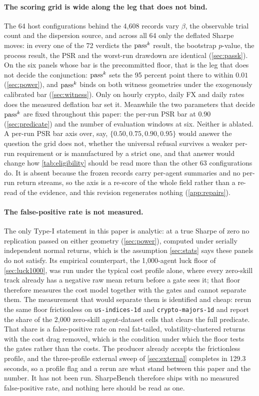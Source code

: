 \paragraph{The scoring grid is wide along the leg that does not bind.} The 64 host configurations behind the 4{,}608 records vary $\beta$, the observable trial count and the dispersion source, and across all 64 only the deflated Sharpe moves: in every one of the 72 verdicts the $\text{pass}^{k}$ result, the bootstrap $p$-value, the process result, the PSR and the worst-run drawdown are identical (\cref{sec:passk}). On the six panels whose bar is the precommitted floor, that is the leg that does not decide the conjunction: $\text{pass}^{k}$ sets the 95 percent point there to within $0.01$ (\cref{sec:power}), and $\text{pass}^{k}$ binds on both witness geometries under the exogenously calibrated bar (\cref{sec:witness}). Only on hourly crypto, daily FX and daily rates does the measured deflation bar set it. Meanwhile the two parameters that decide $\text{pass}^{k}$ are fixed throughout this paper: the per-run PSR bar at $0.90$ (\cref{sec:predicate}) and the number of evaluation windows at six. Neither is ablated. A per-run PSR bar axis over, say, $\{0.50, 0.75, 0.90, 0.95\}$ would answer the question the grid does not, whether the universal refusal survives a weaker per-run requirement or is manufactured by a strict one, and that answer would change how \cref{tab:eligibility} should be read more than the other 63 configurations do. It is absent because the frozen records carry per-agent summaries and no per-run return streams, so the axis is a re-score of the whole field rather than a re-read of the evidence, and this revision regenerates nothing (\cref{app:repairs}).

\paragraph{The false-positive rate is not measured.} The only Type-I statement in this paper is analytic: at a true Sharpe of zero no replication passed on either geometry (\cref{sec:power}), computed under serially independent normal returns, which is the assumption \cref{sec:stats} says these panels do not satisfy. Its empirical counterpart, the 1{,}000-agent luck floor of \cref{sec:luck1000}, was run under the typical cost profile alone, where every zero-skill track already has a negative raw mean return before a gate sees it; that floor therefore measures the cost model together with the gates and cannot separate them. The measurement that would separate them is identified and cheap: rerun the same floor frictionless on \texttt{us-indices-1d} and \texttt{crypto-majors-1d} and report the share of the 2{,}000 zero-skill agent-dataset cells that clears the full predicate. That share is a false-positive rate on real fat-tailed, volatility-clustered returns with the cost drag removed, which is the condition under which the floor tests the gates rather than the costs. The producer already accepts the frictionless profile, and the three-profile external sweep of \cref{sec:external} completes in 129.3 seconds, so a profile flag and a rerun are what stand between this paper and the number. It has not been run. SharpeBench therefore ships with no measured false-positive rate, and nothing here should be read as one.

